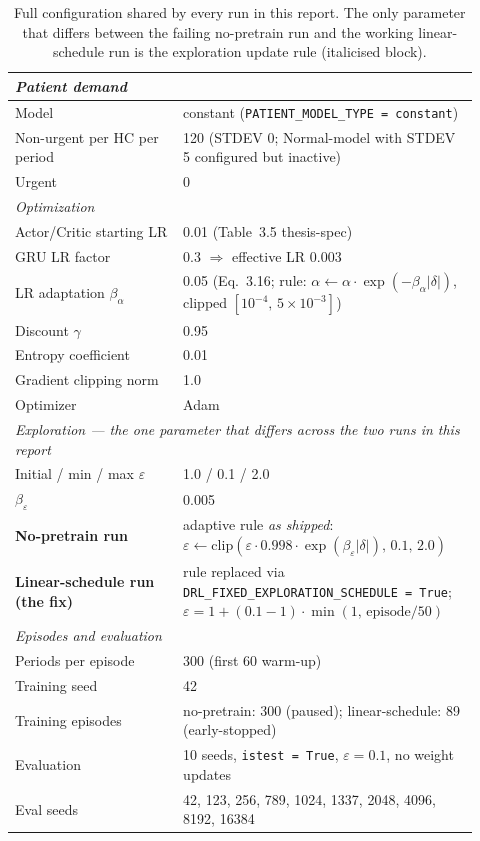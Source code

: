 \documentclass[11pt,letterpaper]{article}
\newcommand{\code}[1]{\texttt{\small #1}}
\begin{document}
\begin{table}[h!]
\begin{tabular}{p{0.34\linewidth} p{0.58\linewidth}}
\midrule
\multicolumn{2}{l}{\emph{Patient demand}} \\
\midrule
Model                            & constant (\code{PATIENT\_MODEL\_TYPE = constant}) \\
Non-urgent per HC per period     & 120 (STDEV 0; Normal-model with STDEV 5 configured but inactive) \\
Urgent                           & 0 \\
\midrule
\multicolumn{2}{l}{\emph{Optimization}} \\
\midrule
Actor/Critic starting LR         & 0.01 (Table~3.5 thesis-spec) \\
GRU LR factor                    & 0.3 $\Rightarrow$ effective LR $0.003$ \\
LR adaptation $\beta_\alpha$     & 0.05 (Eq.~3.16; rule: $\alpha \leftarrow \alpha\cdot\exp(-\beta_\alpha\lvert\delta\rvert)$, clipped $[10^{-4},\,5\!\times\!10^{-3}]$) \\
Discount $\gamma$                & 0.95 \\
Entropy coefficient              & 0.01 \\
Gradient clipping norm           & 1.0 \\
Optimizer                        & Adam \\
\midrule
\multicolumn{2}{l}{\emph{Exploration --- the one parameter that differs across the two runs in this report}} \\
\midrule
Initial / min / max $\varepsilon$ & 1.0 / 0.1 / 2.0 \\
$\beta_\varepsilon$              & 0.005 \\
\textbf{No-pretrain run}         & adaptive rule \emph{as shipped}: $\varepsilon\leftarrow\mathrm{clip}(\varepsilon\cdot 0.998\cdot\exp(\beta_\varepsilon\lvert\delta\rvert),\,0.1,\,2.0)$ \\
\textbf{Linear-schedule run (the fix)} & rule replaced via \code{DRL\_FIXED\_EXPLORATION\_SCHEDULE = True}; $\varepsilon = 1 + (0.1-1)\cdot\min(1,\,\text{episode}/50)$ \\
\midrule
\multicolumn{2}{l}{\emph{Episodes and evaluation}} \\
\midrule
Periods per episode              & 300 (first 60 warm-up) \\
Training seed                    & 42 \\
Training episodes                & no-pretrain: 300 (paused); linear-schedule: 89 (early-stopped) \\
Evaluation                       & 10 seeds, \code{istest = True}, $\varepsilon = 0.1$, no weight updates \\
Eval seeds                       & 42, 123, 256, 789, 1024, 1337, 2048, 4096, 8192, 16384 \\
\bottomrule
\end{tabular}
\caption{Full configuration shared by every run in this report.  The only
parameter that differs between the failing no-pretrain run and the working
linear-schedule run is the exploration update rule (italicised block).}
\label{tab:setup}
\end{table}
\end{document}
